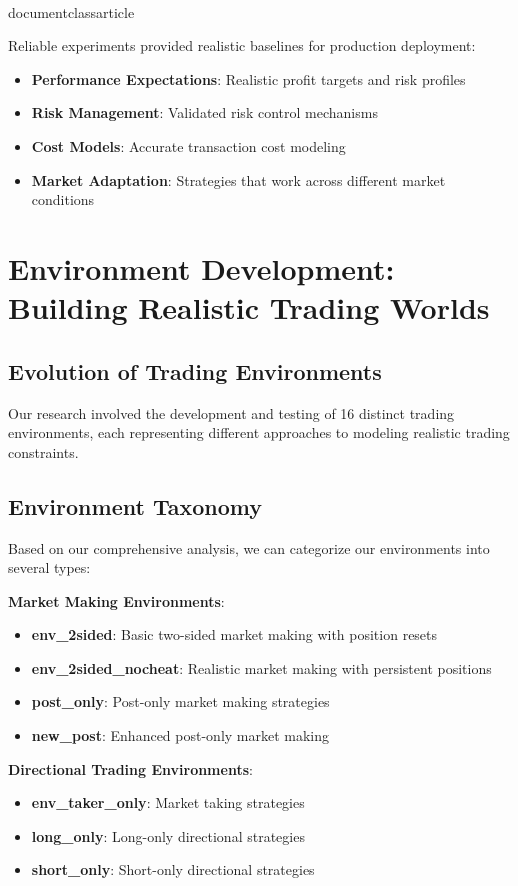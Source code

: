 \\documentclass{article}
\begin{document}
Reliable experiments provided realistic baselines for production deployment:

\begin{itemize}
\item \textbf{Performance Expectations}: Realistic profit targets and risk profiles
\item \textbf{Risk Management}: Validated risk control mechanisms
\item \textbf{Cost Models}: Accurate transaction cost modeling
\item \textbf{Market Adaptation}: Strategies that work across different market conditions
\end{itemize}
\n\n
\section{Environment Development: Building Realistic Trading Worlds}

\subsection{Evolution of Trading Environments}

Our research involved the development and testing of 16 distinct trading environments, each representing different approaches to modeling realistic trading constraints.

\subsection{Environment Taxonomy}

Based on our comprehensive analysis, we can categorize our environments into several types:

\textbf{Market Making Environments}:
\begin{itemize}
\item \textbf{env\_2sided}: Basic two-sided market making with position resets
\item \textbf{env\_2sided\_nocheat}: Realistic market making with persistent positions
\item \textbf{post\_only}: Post-only market making strategies
\item \textbf{new\_post}: Enhanced post-only market making
\end{itemize}

\textbf{Directional Trading Environments}:
\begin{itemize}
\item \textbf{env\_taker\_only}: Market taking strategies
\item \textbf{long\_only}: Long-only directional strategies
\item \textbf{short\_only}: Short-only directional strategies
\end{itemize}
\end{document}
